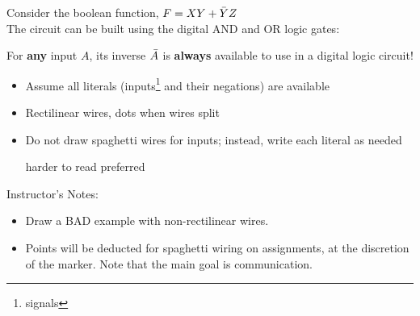 \begin{frame}[fragile]
    Consider the boolean function, $F = XY + \Bar{Y}Z$
    \\
The circuit can be built using the digital AND and OR logic gates:
\bigskip

 \begin{tcolorbox}[enhanced,attach boxed title to top center={yshift=-3mm,yshifttext=-1mm},
  colback=green!5!white,colframe=green!75!black,colbacktitle=green!80!black,
  title=Remember It,fonttitle=\bfseries,
  boxed title style={size=small,colframe=green!50!black} ]
For \textbf{any} input $A$, its inverse $\Bar{A}$ is \textbf{always} available to use in a digital logic circuit!
  \end{tcolorbox}
\end{frame}

\begin{frame}[fragile]
\begin{itemize}
	\item Assume all literals (inputs\footnote{signals} and their negations) are available
	\item Rectilinear wires, dots when wires split
	\item Do not draw spaghetti wires for inputs; instead, write
	each literal as needed


	\centerline{\hfill harder to read \hfill preferred \hfill}

\end{itemize}
\BNotes\ifnum{}
Instructor's Notes:
\begin{itemize}
\item Draw a BAD example with non-rectilinear wires.
\item Points will be deducted for spaghetti wiring on assignments, at the
discretion of the marker. Note that the main goal is communication.
\end{itemize}
\fi\ENotes
\end{frame}

